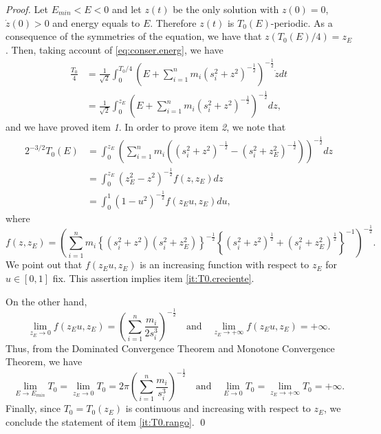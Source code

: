 \documentclass[smallcondensed]{svjour3}
\begin{document}
\begin{proof}
Let $E_{min}<E<0$ and let $z(t)$ be the only solution with $z(0)=0$, $\dot{z}(0)>0$ and energy equals to $E$. Therefore $z(t)$ is $T_0(E)$-periodic. As a consequence of the symmetries of the equation, we have that $z(T_0(E)/4)=z_E$. Then, taking account of \eqref{eq:conser.energ}, we have 
\begin{equation*}
 \begin{split}
  \frac{T_0}{4}&=\frac{1}{\sqrt{2}}\int_0^{T_0/4}\left(E+\sum_{i=1}^n m_i (s_i^2+z^2)^{-\frac12}\right)^{-\frac12} \dot{z} dt\\
  &=\frac{1}{\sqrt{2}}\int_{0}^{z_E} \left(E+\sum_{i=1}^n m_i (s_i^2+z^2)^{-\frac12}\right)^{-\frac12} dz,
 \end{split}
\end{equation*}
and we have proved item \textit{1}. In order to prove item \textit{2}, we note that
\begin{equation*}
 \begin{split}
  2^{-3/2}T_0(E)
  &=
    \int_0^{z_E}\left(\sum_{i=1}^n m_i \left((s_i^2+z^2)^{-\frac12}-(s_i^2+z_E^2)^{-\frac12}\right)\right)^{-\frac12}dz\\
  &=\int_0^{z_E} \left(z_E^2-z^2\right)^{-\frac12} f(z,z_E)dz\\
  &=\int_0^1 \left(1-u^2\right)^{-\frac12} f(z_Eu,z_E)du,
 \end{split}
 \end{equation*}
where \[f(z,z_E)=\left(\sum_{i=1}^n m_i \left\{(s_i^2+z^2)(s_i^2+z_E^2)\right\}^{-\frac12} \left\{(s_i^2+z^2)^{\frac12}+(s_i^2+z_E^2)^{\frac12} \right\}^{-1}\right)^{-\frac12}.\]
We point out that $f(z_Eu,z_E)$ is an increasing function with respect to $z_E$ for $u\in [0,1]$ fix. This assertion implies item \ref{it:T0.creciente}.

On the other hand,
\begin{equation*}
 \lim\limits_{z_E \to 0}f(z_Eu,z_E)=\left(\sum_{i=1}^{n} \frac{m_i}{2s_i^3}\right)^{-\frac12} \quad \text{and}\quad  \lim\limits_{z_E \to +\infty}f(z_Eu,z_E)=+\infty.
\end{equation*}
Thus, from the Dominated Convergence Theorem and Monotone Convergence Theorem, we have 
\[\lim\limits_{E\to E_{min}}T_0=\lim\limits_{z_E\to 0}T_0=2\pi\left(\sum_{i=1}^{n} \frac{m_i}{s_i^3}\right)^{-\frac12}\quad \text{and}\quad \lim\limits_{E\to 0}T_0=\lim\limits_{z_E\to +\infty}T_0=+\infty.\]
Finally,  since $T_0=T_0(z_E)$ is continuous and increasing with respect to $z_E$, we conclude the statement of item \ref{it:T0.rango}.
\qed\end{proof}
\end{document}
